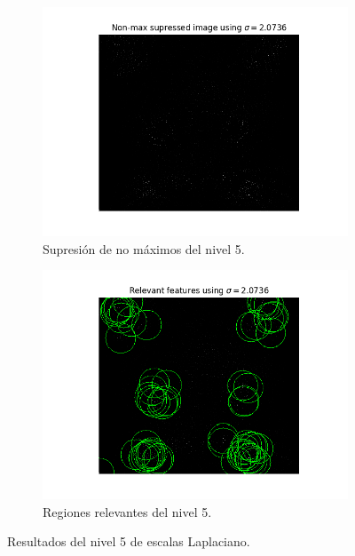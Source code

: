 \documentclass[11pt,a4paper]{article}
\begin{document}
\begin{figure}[H]
\begin{subfigure}{.5\linewidth}
	\centering
	\includegraphics[scale=0.5]{img/non-max5.png}
	\caption{Supresión de no máximos del nivel 5.}
	\label{fig:non-max5}
\end{subfigure}
\begin{subfigure}{.5\linewidth}
	\centering
	\includegraphics[scale=0.5]{img/features5.png}
	\caption{Regiones relevantes del nivel 5.}
	\label{fig:features5}
\end{subfigure}
\caption{Resultados del nivel 5 de escalas Laplaciano.}
\label{fig:lap-scale-space5}
\end{figure}
\end{document}
